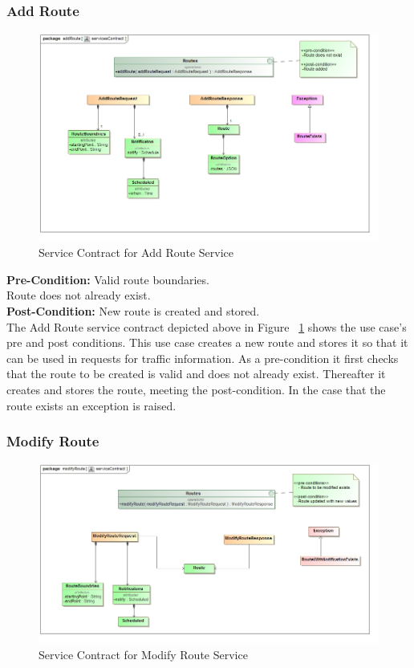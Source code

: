 \documentclass[a4paper,12pt]{article}
\begin{document}
\subsubsection{Add Route}
\begin{figure}[here]
\includegraphics[width=\textwidth]{images/scAdd_Route.jpg}
\caption{Service Contract for Add Route Service}
\label{fig:sc_addroute}
\end{figure}

\textbf{Pre-Condition: }
Valid route boundaries.\\
Route does not already exist.\\
\textbf{Post-Condition: }
New route is created and stored.\\

The Add Route service contract depicted above in Figure ~\ref{fig:sc_addroute} shows the use case's pre and post conditions. This use case creates a new route and stores it so that it can be used in requests for traffic information. As a pre-condition it first checks that the route to be created is valid and does not already exist. Thereafter it creates and stores the route, meeting the post-condition. In the case that the route exists an exception is raised.
\subsubsection{Modify Route} 
\begin{figure}[here]
\includegraphics[width=\textwidth]{images/scModify_Route.jpg}
\caption{Service Contract for Modify Route Service}
\label{fig:sc_modifyroute}
\end{figure}
\end{document}
